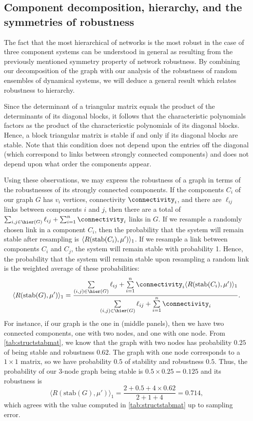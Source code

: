 \subsection{Component decomposition, hierarchy, and the symmetries of robustness}

The fact that the most hierarchical of networks is the most robust in the case of three component systems can be understood in general as resulting from the previously mentioned symmetry property of network robustness.  By combining our decomposition of the graph with our analysis of the robustness of random ensembles of dynamical systems, we will deduce a general result which relates robustness to hierarchy.

Since the determinant of a triangular matrix equals the product of the determinants of its diagonal blocks, it follows that the characteristic polynomials factors as the product of the charactericstic polynomials of its diagonal blocks.  Hence, a block triangular matrix is stable if and only if its diagonal blocks are stable.  Note that this condition does not depend upon the entries off the diagonal (which correspond to links between strongly connected components) and does not depend upon what order the components appear.

Using these observations, we may express the robustness of a graph in
terms of the robustnesses of its strongly connected components.  If
the components $C_i$ of our graph $G$ has $v_i$ vertices, connectivity
$\connectivity_i$, and there are $\ell_{ij}$ links between components
$i$ and $j$, then there are a total of
$\sum_{i,j \in \hier(G)} \ell_{ij} + \sum_{i=1}^n \connectivity_i$
links in $G$.  If we resample a randomly chosen link in a component
$C_i$, then the probability that the system will remain stable after
resampling is $\langle R(\hbox{stab} (C_i), \mu') \rangle_1$.  If we resample a link
between components $C_i$ and $C_j$, the system will remain stable with
probability 1.  Hence, the probability that the system will remain
stable upon resampling a random link is the weighted average of these
probabilities:
\begin{align}\label{eq:sccrobustness}
\langle R(\hbox{stab} (G), \mu') \rangle_1 =
\frac{\sum\limits_{(i,j) \in \hier(G)} \ell_{ij} +
      \sum\limits_{i=1}^n \connectivity_i \langle R(\textrm{stab}(C_i),\mu') \rangle_1}
     {\sum\limits_{(i,j) \in \hier(G)} \ell_{ij} +
      \sum\limits_{i=1}^n \connectivity_i}.
\end{align}
For instance, if our graph is the one in  (middle panels), then we have two connected components, one with two nodes, and one with one node.  From \ref{tab:structstabmat}, we know that the graph with two nodes has probability $0.25$ of being stable and robustness $0.62$.  The graph with one node corresponds to a $1 \times 1$ matrix, so we have probability $0.5$ of stability and robustness $0.5$.  Thus, the probability of our 3-node graph being stable is $0.5 \times 0.25 = 0.125$ and its robustness is
\[
\langle R(\textrm{stab}(G),\mu') \rangle_1 = \frac{2 + 0.5 + 4 \times 0.62}{2 + 1 + 4} = 0.714,
\]
which agrees with the value computed in \ref{tab:structstabmat} up to
sampling error.

